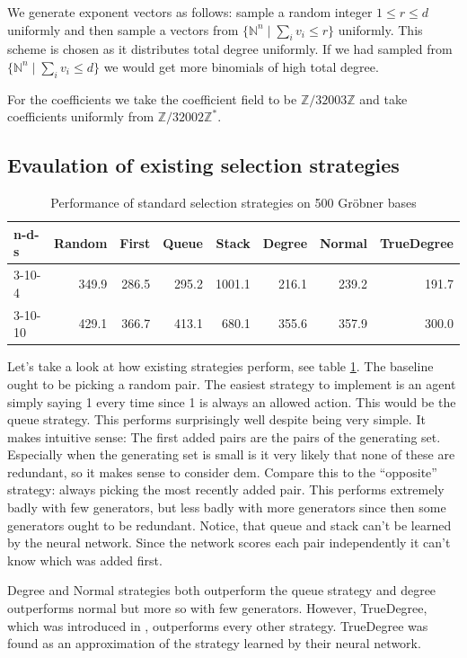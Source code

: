 \documentclass{article}
\theoremstyle{changedot}
\theoremstyle{changedotbreak}
\theoremstyle{nonumberplain}
\newcommand{\m}{\mathbb}
\begin{document}
We generate exponent vectors as follows: sample a random integer $1 \leq r \leq d$ uniformly and then sample a vectors from $\{\m N^{n} \mid \sum_{i} v_{i} \leq r\}$ uniformly. This scheme is chosen as it distributes total degree uniformly. If we had sampled from $\{\m N^{n} \mid \sum_{i} v_{i} \leq d\}$ we would get more binomials of high total degree.

For the coefficients we take the coefficient field to be $\m Z / 32003 \m Z$ and take coefficients uniformly from $\m Z / 32002\m Z ^{*}$.

\subsection{Evaulation of existing selection strategies}
\begin{table}
  \begin{center}
  \begin{tabular}{lrrrrrrr}
    n-d-s   & Random & First & Queue & Stack  & Degree & Normal & TrueDegree \\ \hline
    3-10-4  & 349.9  & 286.5 & 295.2 & 1001.1 & 216.1  & 239.2  & 191.7 \\
    3-10-10 & 429.1  & 366.7 & 413.1 & 680.1  & 355.6  & 357.9  & 300.0
  \end{tabular}
  \end{center}
  \caption{Performance of standard selection strategies on 500 Gröbner bases}
  \label{tab:std_perf}
\end{table}

Let's take a look at how existing strategies perform, see table \ref{tab:std_perf}. The baseline ought to be picking a random pair. The easiest strategy to implement is an agent simply saying 1 every time since 1 is always an allowed action. This would be the queue strategy. This performs surprisingly well despite being very simple. It makes intuitive sense: The first added pairs are the pairs of the generating set. Especially when the generating set is small is it very likely that none of these are redundant, so it makes sense to consider dem. Compare this to the ``opposite'' strategy: always picking the most recently added pair. This performs extremely badly with few generators, but less badly with more generators since then some generators ought to be redundant. Notice, that queue and stack can't be learned by the neural network. Since the network scores each pair independently it can't know which was added first.

Degree and Normal strategies both outperform the queue strategy and degree outperforms normal but more so with few generators. However, TrueDegree, which was introduced in \cite{peifer}, outperforms every other strategy. TrueDegree was found as an approximation of the strategy learned by their neural network.
\end{document}
